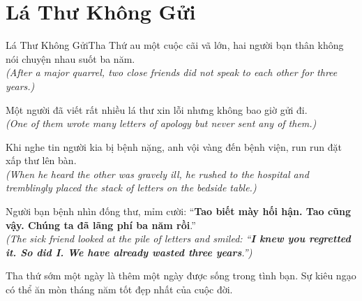 \section{Lá Thư Không Gửi}
\begin{truyen}{Lá Thư Không Gửi}{Tha Thứ}
au một cuộc cãi vã lớn, hai người bạn thân không nói chuyện nhau suốt ba năm.\\
\textit{(After a major quarrel, two close friends did not speak to each other for three years.)}

Một người đã viết rất nhiều lá thư xin lỗi nhưng không bao giờ gửi đi.\\
\textit{(One of them wrote many letters of apology but never sent any of them.)}

Khi nghe tin người kia bị bệnh nặng, anh vội vàng đến bệnh viện, run run đặt xấp thư lên bàn.\\
\textit{(When he heard the other was gravely ill, he rushed to the hospital and tremblingly placed the stack of letters on the bedside table.)}

Người bạn bệnh nhìn đống thư, mỉm cười: ``\textbf{Tao biết mày hối hận. Tao cũng vậy. Chúng ta đã lãng phí ba năm rồi}.''\\
\textit{(The sick friend looked at the pile of letters and smiled: ``\textbf{I knew you regretted it. So did I. We have already wasted three years}.'')}
\end{truyen}
\begin{baihoc}
  Tha thứ sớm một ngày là thêm một ngày được sống trong tình bạn. Sự kiêu ngạo có thể ăn mòn tháng năm tốt đẹp nhất của cuộc đời.
\end{baihoc}

